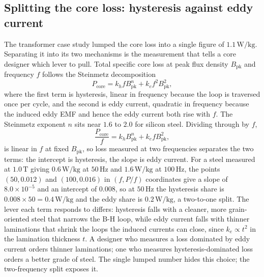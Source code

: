 

\subsection{Splitting the core loss: hysteresis against eddy current}

The transformer case study lumped the core loss into a single figure of
$1.1\,\si{\watt\per\kilogram}$. Separating it into its two mechanisms is
the measurement that tells a core designer which lever to pull. Total
specific core loss at peak flux density $B_{\text{pk}}$ and frequency
$f$ follows the Steinmetz decomposition
\[
P_{\text{core}} = k_h f B_{\text{pk}}^{n} + k_e f^{2} B_{\text{pk}}^{2},
\]
where the first term is hysteresis, linear in frequency because the
loop is traversed once per cycle, and the second is eddy current,
quadratic in frequency because the induced eddy EMF and hence the eddy
current both rise with $f$. The Steinmetz exponent $n$ sits near $1.6$
to $2.0$ for silicon steel. Dividing through by $f$,
\[
\frac{P_{\text{core}}}{f} = k_h B_{\text{pk}}^{n} + k_e f
B_{\text{pk}}^{2},
\]
is linear in $f$ at fixed $B_{\text{pk}}$, so loss measured at two
frequencies separates the two terms: the intercept is hysteresis, the
slope is eddy current. For a steel measured at $1.0\,\si{\tesla}$ giving
$0.6\,\si{\watt\per\kilogram}$ at $50\,\si{\hertz}$ and $1.6\,\si{\watt
\per\kilogram}$ at $100\,\si{\hertz}$, the points $(50, 0.012)$ and
$(100, 0.016)$ in $(f, P/f)$ coordinates give a slope of $8.0\times
10^{-5}$ and an intercept of $0.008$, so at $50\,\si{\hertz}$ the
hysteresis share is $0.008\times 50 = 0.4\,\si{\watt\per\kilogram}$ and
the eddy share is $0.2\,\si{\watt\per\kilogram}$, a two-to-one split.
The lever each term responds to differs: hysteresis falls with a
cleaner, more grain-oriented steel that narrows the B-H loop, while eddy
current falls with thinner laminations that shrink the loops the induced
currents can close, since $k_e \propto t^{2}$ in the lamination
thickness $t$. A designer who measures a loss dominated by eddy current
orders thinner laminations; one who measures hysteresis-dominated loss
orders a better grade of steel. The single lumped number hides this
choice; the two-frequency split exposes it.

